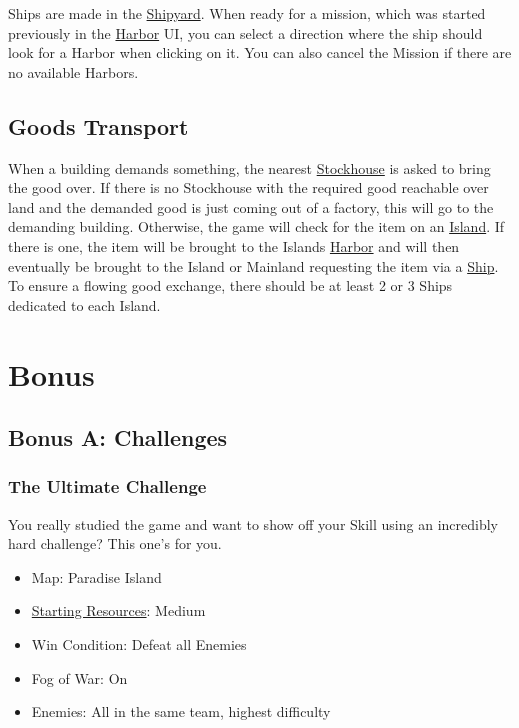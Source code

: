 \documentclass[12pt]{article}
\begin{document}
Ships are made in the \hyperref[sec:shipyard]{Shipyard}. When ready for a mission, which was started previously in the \hyperref[sec:harbor]{Harbor} UI, you can select a direction where the ship should look for a Harbor when clicking on it. You can also cancel the Mission if there are no available Harbors.

\subsection{Goods Transport}
\label{sec:goodstransport}

When a building demands something, the nearest \hyperref[sec:stockhouse]{Stockhouse} is asked to bring the good over. If there is no Stockhouse with the required good reachable over land and the demanded good is just coming out of a factory, this will go to the demanding building. Otherwise, the game will check for the item on an \hyperref[sec:islands]{Island}. If there is one, the item will be brought to the Islands \hyperref[sec:harbor]{Harbor} and will then eventually be brought to the Island or Mainland requesting the item via a \hyperref[sec:ships]{Ship}. To ensure a flowing good exchange, there should be at least 2 or 3 Ships dedicated to each Island.

\section{Bonus}
\label{sec:bonus}

\subsection{Bonus A: Challenges}
\label{sec:challenges}

\subsubsection{The Ultimate Challenge}
\label{sec:challenge_ultimate}

You really studied the game and want to show off your Skill using an incredibly hard challenge? This one's for you.

\begin{itemize}
  \item Map: Paradise Island
  \item \hyperref[sec:startingresources]{Starting Resources}: Medium
  \item Win Condition: Defeat all Enemies
  \item Fog of War: On
  \item Enemies: All in the same team, highest difficulty
\end{itemize}
\end{document}
